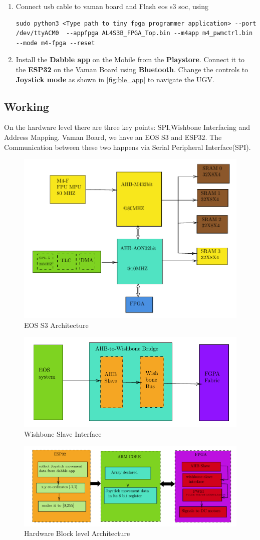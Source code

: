 \begin{enumerate}[label=\thesection.\arabic*.,ref=\thesection.\theenumi]
\item Connect usb cable to vaman board and Flash eos s3 soc, using
\begin{lstlisting}
sudo python3 <Type path to tiny fpga programmer application> --port /dev/ttyACM0  --appfpga AL4S3B_FPGA_Top.bin --m4app m4_pwmctrl.bin --mode m4-fpga --reset
\end{lstlisting} 

\item Install the \textbf{Dabble app} on the Mobile from the \textbf{Playstore}.
Connect it to the \textbf{ESP32} on the Vaman Board using \textbf{Bluetooth}.
Change the controls to \textbf{Joystick mode} as shown in
\autoref{fig:ble_app} to navigate the UGV.
\end{enumerate}
\subsection{Working}
On the hardware level there are three key points: SPI,Wishbone Interfacing and Address Mapping. Vaman Board, we have an EOS S3 and ESP32. The Communication between these two happens via Serial Peripheral Interface(SPI).\\
\vspace{0.25cm}

\begin{figure}[!ht]
\centering
\includegraphics[width=0.5\columnwidth]{ugv/figs/block3}
\centering
\caption{EOS S3 Architecture }
\end{figure}

\begin{figure}[!ht]
\centering
\includegraphics[width=0.5\columnwidth]{ugv/figs/block4}
\centering
\caption{Wishbone Slave Interface  }
\end{figure}
\begin{figure}[!ht]
\centering
\includegraphics[width=0.5\columnwidth]{ugv/figs/block5}
\centering
\caption{Hardware Block level Architecture }
\end{figure}
